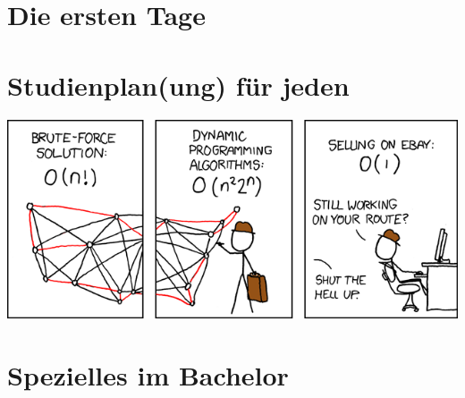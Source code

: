 \documentclass[]{papertex}
\begin{document}
	\thispagestyle{empty}
	\clearpage


	\setcounter{page}{1}
	\tableofcontents
	
	\newpage

	\section{Die ersten Tage}
		
		
	\newpage

	\section{Studienplan(ung) für jeden}
		\label{studienplan}
		\begin{multicols}{2}
		
		\end{multicols}

		\vfill
		\begin{center}
			\includegraphics[width=\textwidth]{bilder/XKCD/travelling_salesman}
		\end{center}
		\vfill
	\newpage

	\section{Spezielles im Bachelor}
		\label{bachelor}
		\begin{multicols}{2}
		
		
		
		\end{multicols}
		
\end{document}
